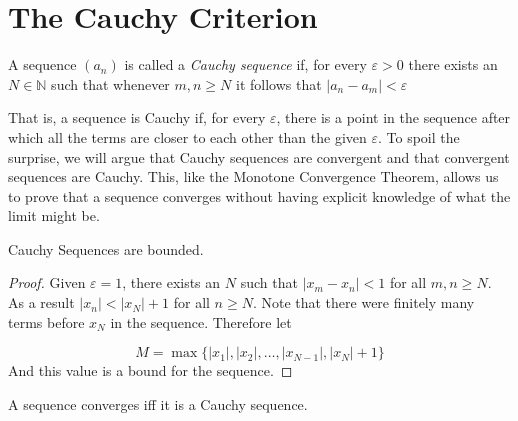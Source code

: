 \section{The Cauchy Criterion}  
  A sequence $(a_n)$ is called a \emph{Cauchy sequence} if, for every $\varepsilon >0$ there exists an $N \in \mathbb{N}$ such that whenever $m,n \geq N$ it follows that $|a_n - a_m| < \varepsilon$

That is, a sequence is Cauchy if, for every $\varepsilon$, there is a point in the sequence after which all the terms are closer to each other than the given $\varepsilon$.  To spoil the surprise, we will argue that Cauchy sequences are convergent and that convergent sequences are Cauchy.  This, like the Monotone Convergence Theorem, allows us to prove that a sequence converges without having explicit knowledge of what the limit might be. 


\begin{lemma} Cauchy Sequences are bounded.\end{lemma}

\begin{proof}
	Given $\varepsilon = 1$, there exists an $N$ such that $|x_m - x_n| <1$ for all $m,n \geq N$.  
	As a result   $|x_n| < |x_N| + 1$ for all $n \geq N$. Note that there were finitely many terms before $x_N$ in the sequence. Therefore let
	
	
	\[	M	= \max \{|x_1|,|x_2|, \ldots, |x_{N-1}|, |x_N| + 1 \}\]
	And this value is a bound for the sequence.
\end{proof}


\begin{theorem} A sequence converges iff it is a Cauchy sequence. \end{theorem}

